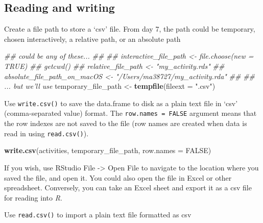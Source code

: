 \documentclass[
]{book}
\newenvironment{Shaded}{\begin{snugshade}}{\end{snugshade}}
\newcommand{\CommentTok}[1]{\textcolor[rgb]{0.56,0.35,0.01}{\textit{#1}}}
\newcommand{\DataTypeTok}[1]{\textcolor[rgb]{0.13,0.29,0.53}{#1}}
\newcommand{\KeywordTok}[1]{\textcolor[rgb]{0.13,0.29,0.53}{\textbf{#1}}}
\newcommand{\NormalTok}[1]{#1}
\newcommand{\OtherTok}[1]{\textcolor[rgb]{0.56,0.35,0.01}{#1}}
\newcommand{\StringTok}[1]{\textcolor[rgb]{0.31,0.60,0.02}{#1}}
\begin{document}
\hypertarget{reading-and-writing}{%
\subsection*{Reading and writing}\label{reading-and-writing}}

Create a file path to store a `csv' file. From day 7, the path could be temporary, chosen interactively, a relative path, or an absolute path

\begin{Shaded}
\begin{Highlighting}[]
\CommentTok{## could be any of these...}
\CommentTok{##}
\CommentTok{## interactive_file_path <- file.choose(new = TRUE)}
\CommentTok{## getcwd()}
\CommentTok{## relative_file_path <- "my_activity.rds"}
\CommentTok{## absolute_file_path_on_macOS <- "/Users/ma38727/my_activity.rda"}
\CommentTok{##}
\CommentTok{## ... but we'll use}
\NormalTok{temporary_file_path <-}\StringTok{ }\KeywordTok{tempfile}\NormalTok{(}\DataTypeTok{fileext =} \StringTok{".csv"}\NormalTok{)}
\end{Highlighting}
\end{Shaded}

Use \texttt{write.csv()} to save the data.frame to disk as a plain text file in `csv' (comma-separated value) format. The \texttt{row.names\ =\ FALSE} argument means that the row indexes are not saved to the file (row names are created when data is read in using \texttt{read.csv()}).

\begin{Shaded}
\begin{Highlighting}[]
\KeywordTok{write.csv}\NormalTok{(activities, temporary_file_path, }\DataTypeTok{row.names =} \OtherTok{FALSE}\NormalTok{)}
\end{Highlighting}
\end{Shaded}

If you wish, use RStudio File -\textgreater{} Open File to navigate to the location where you saved the file, and open it. You could also open the file in Excel or other spreadsheet. Conversely, you can take an Excel sheet and export it as a csv file for reading into \emph{R}.

Use \texttt{read.csv()} to import a plain text file formatted as csv
\end{document}
